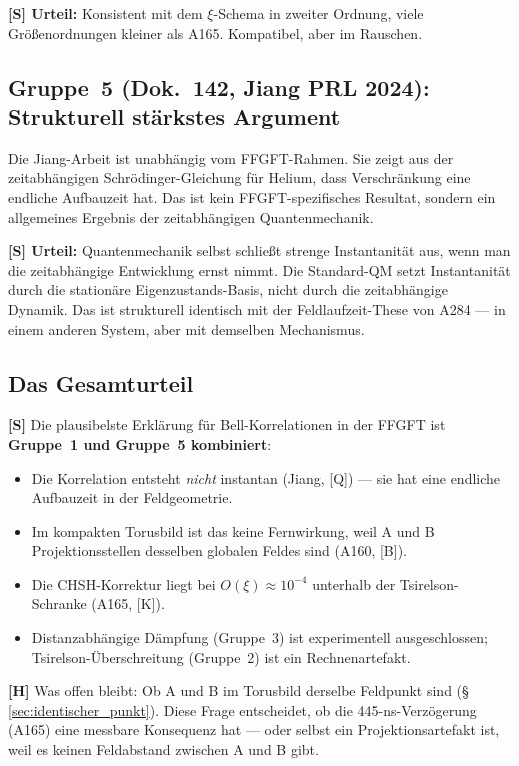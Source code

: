 \textbf{[S] Urteil:} Konsistent mit dem $\xi$-Schema in zweiter Ordnung,
viele Größenordnungen kleiner als A165. Kompatibel, aber im Rauschen.

\subsection{Gruppe~5 (Dok.~142, Jiang PRL 2024): Strukturell stärkstes Argument}

Die Jiang-Arbeit ist unabhängig vom FFGFT-Rahmen. Sie zeigt aus der
zeitabhängigen Schrödinger-Gleichung für Helium, dass Verschränkung
eine endliche Aufbauzeit hat. Das ist kein FFGFT-spezifisches Resultat,
sondern ein allgemeines Ergebnis der zeitabhängigen Quantenmechanik.

\textbf{[S] Urteil:} Quantenmechanik selbst schließt strenge Instantanität
aus, wenn man die zeitabhängige Entwicklung ernst nimmt. Die Standard-QM
setzt Instantanität durch die stationäre Eigenzustands-Basis, nicht durch
die zeitabhängige Dynamik. Das ist strukturell identisch mit der
Feldlaufzeit-These von A284 --- in einem anderen System, aber mit
demselben Mechanismus.

\subsection{Das Gesamturteil}

\textbf{[S]} Die plausibelste Erklärung für Bell-Korrelationen in der
FFGFT ist \textbf{Gruppe~1 und Gruppe~5 kombiniert}:

\begin{itemize}[leftmargin=1.4em,itemsep=0.3em]
  \item Die Korrelation entsteht \emph{nicht} instantan (Jiang, [Q]) ---
        sie hat eine endliche Aufbauzeit in der Feldgeometrie.
  \item Im kompakten Torusbild ist das keine Fernwirkung, weil A und B
        Projektionsstellen desselben globalen Feldes sind
        (A160, [B]).
  \item Die CHSH-Korrektur liegt bei $O(\xi) \approx 10^{-4}$
        unterhalb der Tsirelson-Schranke (A165, [K]).
  \item Distanzabhängige Dämpfung (Gruppe~3) ist experimentell
        ausgeschlossen; Tsirelson-Überschreitung (Gruppe~2) ist
        ein Rechnenartefakt.
\end{itemize}

\textbf{[H]} Was offen bleibt: Ob A und B im Torusbild derselbe
Feldpunkt sind (§\,\ref{sec:identischer_punkt}). Diese Frage entscheidet,
ob die 445-ns-Verzögerung (A165) eine messbare Konsequenz hat --- oder
selbst ein Projektionsartefakt ist, weil es keinen Feldabstand zwischen
A und B gibt.

